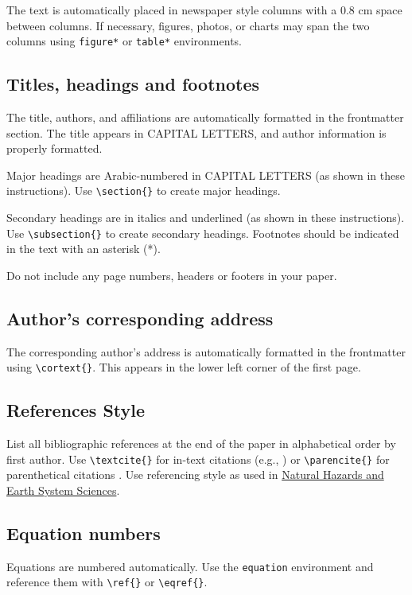 \documentclass{issw}
\begin{document}
The text is automatically placed in newspaper style columns with a 0.8 cm space between columns. If necessary, figures, photos, or charts may span the two columns using \verb|figure*| or \verb|table*| environments.

\subsection{Titles, headings and footnotes}
The title, authors, and affiliations are automatically formatted in the frontmatter section. The title appears in CAPITAL LETTERS, and author information is properly formatted.

Major headings are Arabic-numbered in CAPITAL LETTERS (as shown in these instructions). Use \verb|\section{}| to create major headings.

Secondary headings are in italics and underlined (as shown in these instructions). Use \verb|\subsection{}| to create secondary headings. Footnotes should be indicated in the text with an asterisk (*).

Do not include any page numbers, headers or footers in your paper.

\subsection{Author's corresponding address}
The corresponding author's address is automatically formatted in the frontmatter using \verb|\cortext{}|. This appears in the lower left corner of the first page.

\subsection{References Style}
List all bibliographic references at the end of the paper in alphabetical order by first author. Use \verb|\textcite{}| for in-text citations (e.g., \textcite{McClung2006}) or \verb|\parencite{}| for parenthetical citations \parencite{Fischer2022}. Use referencing style as used in \href{https://www.natural-hazards-and-earth-system-sciences.net/submission.html}{Natural Hazards and Earth System Sciences}.

\subsection{Equation numbers}
Equations are numbered automatically. Use the \verb|equation| environment and reference them with \verb|\ref{}| or \verb|\eqref{}|.
\end{document}
